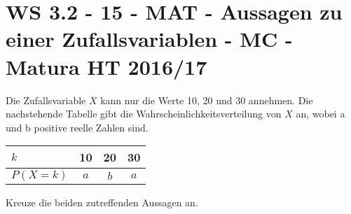\section{WS 3.2 - 15 - MAT - Aussagen zu einer Zufallsvariablen - MC - Matura HT 2016/17}

\begin{beispiel}[WS 3.2]{1} %
Die Zufallsvariable $X$ kann nur die Werte 10, 20 und 30 annehmen. Die nachstehende Tabelle gibt
die Wahrscheinlichkeitsverteilung von $X$ an, wobei a und b positive reelle Zahlen sind. \leer

\begin{center}
\begin{tabular}{|l|c|c|c|} \hline
\cellcolor{black!20} $k$ & 10 & 20 & 30 \\ \hline
\cellcolor{black!20} $P(X=k)$ & $a$ & $b$ & $a$ \\ \hline
\end{tabular}
\end{center}

Kreuze die beiden zutreffenden Aussagen an. \leer

\end{beispiel}